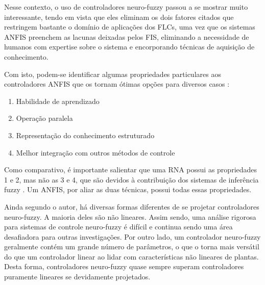 Nesse contexto, o uso de controladores neuro-fuzzy passou a se mostrar muito interessante, tendo em vista que eles eliminam os dois fatores citados que restringem bastante o domínio de aplicações dos FLCs, uma vez que os sistemas ANFIS preenchem as lacunas deixadas pelos FIS, eliminando a necessidade de humanos com expertise sobre o sistema e encorporando técnicas de aquisição de conhecimento.

Com isto, podem-se identificar algumas propriedades particulares aos controladores ANFIS que os tornam ótimas opções para diversos casos \cite[p.~458]{Jang1997}:
\begin{enumerate}
  \item Habilidade de aprendizado
  \item Operação paralela
  \item Representação do conhecimento estruturado
  \item Melhor integração com outros métodos de controle
\end{enumerate}

Como comparativo, é importante salientar que uma RNA possui as propriedades 1 e 2, mas não as 3 e 4, que são devidos à contribuição dos sistemas de inferência fuzzy \cite[p.~458]{Jang1997}. Um ANFIS, por aliar as duas técnicas, possui todas essas propriedades.

Ainda segundo o autor, há diversas formas diferentes de se projetar controladores neuro-fuzzy. A maioria deles são não lineares. Assim sendo, uma análise rigorosa para sistemas de controle neuro-fuzzy é difícil e continua sendo uma área desafiadora para outras investigações. Por outro lado, um controlador neuro-fuzzy geralmente contém um grande número de parâmetros, o que o torna mais versátil do que um controlador linear ao lidar com características não lineares de plantas. Desta forma, controladores neuro-fuzzy quase sempre superam controladores puramente lineares se devidamente projetados.


%

